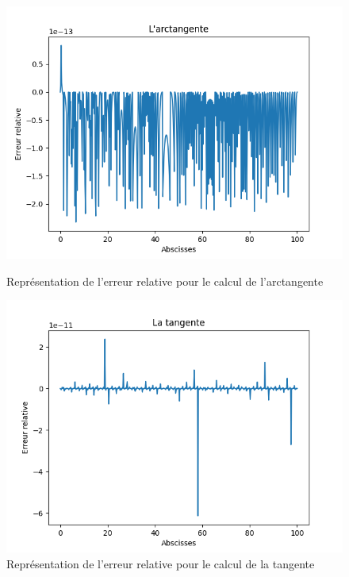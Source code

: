 \documentclass{article}
\begin{document}
\begin{enumerate}
    \begin{figure}[H]
       \begin{minipage}{0.48\textwidth}
         \centering
         \includegraphics[width=1.1\linewidth]{images/er_atan.png}
         \caption{Représentation de l'erreur relative pour le calcul de l'arctangente}\label{repr_err_rel_arctan}
       \end{minipage}\hfill
       \begin{minipage}{0.48\textwidth}
         \centering
         \includegraphics[width=1.1\linewidth]{images/er_tan.png}
         \caption{Représentation de l'erreur relative pour le calcul de la tangente}\label{repr_err_rel_tan}
       \end{minipage}
    \end{figure}
    

\end{enumerate}
\end{document}
